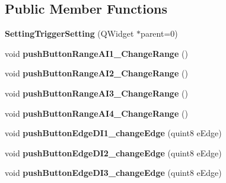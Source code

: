 \subsection*{Public Member Functions}
\begin{DoxyCompactItemize}
\item 
\mbox{\label{class_setting_trigger_setting_a5d088f7065f7ebfd4445a08a9e741c88}} 
{\bfseries Setting\+Trigger\+Setting} (Q\+Widget $\ast$parent=0)
\item 
\mbox{\label{class_setting_trigger_setting_a995f3f5c084e2ef43585903248a373f3}} 
void {\bfseries push\+Button\+Range\+A\+I1\+\_\+\+Change\+Range} ()
\item 
\mbox{\label{class_setting_trigger_setting_a18f1ef255a189c908a6f115f0884ba70}} 
void {\bfseries push\+Button\+Range\+A\+I2\+\_\+\+Change\+Range} ()
\item 
\mbox{\label{class_setting_trigger_setting_a42324ff531aba4af2e54a64f64a3e63e}} 
void {\bfseries push\+Button\+Range\+A\+I3\+\_\+\+Change\+Range} ()
\item 
\mbox{\label{class_setting_trigger_setting_a1a6b9cf08d458982e96f132b2cf0495a}} 
void {\bfseries push\+Button\+Range\+A\+I4\+\_\+\+Change\+Range} ()
\item 
\mbox{\label{class_setting_trigger_setting_a672ad871b7d5554d89d935ccd15ea8e1}} 
void {\bfseries push\+Button\+Edge\+D\+I1\+\_\+change\+Edge} (quint8 e\+Edge)
\item 
\mbox{\label{class_setting_trigger_setting_ac5d4927be3b48154176339c9de4856e0}} 
void {\bfseries push\+Button\+Edge\+D\+I2\+\_\+change\+Edge} (quint8 e\+Edge)
\item 
\mbox{\label{class_setting_trigger_setting_ae3078227b7e0d90d0184a00cfee9a9a4}} 
void {\bfseries push\+Button\+Edge\+D\+I3\+\_\+change\+Edge} (quint8 e\+Edge)
\item 
\mbox{\label{class_setting_trigger_setting_ac6881736494578d65cdbe9d54af0f204}} 

\end{DoxyCompactItemize}
